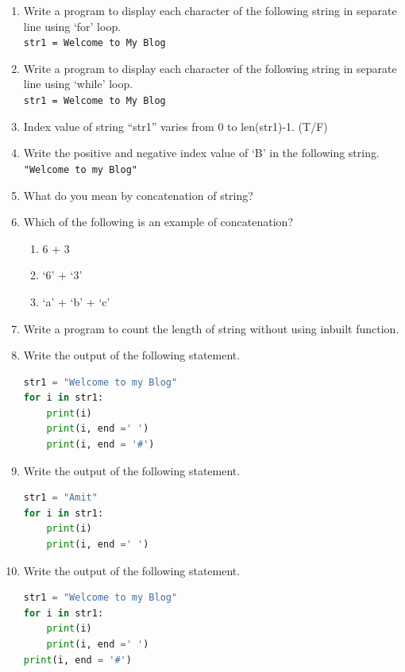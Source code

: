 \documentclass[12pt,a4paper]{article}
\begin{document}
\begin{enumerate}[label=\textbf{Q\arabic*.}]

\item Write a program to display each character of the following string in separate line using `for' loop. \\
\texttt{str1 = Welcome to My Blog}

\item Write a program to display each character of the following string in separate line using `while' loop. \\
\texttt{str1 = Welcome to My Blog}

\item Index value of string ``str1'' varies from 0 to len(str1)-1. (T/F)

\item Write the positive and negative index value of `B' in the following string. \\
\texttt{"Welcome to my Blog"}

\item What do you mean by concatenation of string?

\item Which of the following is an example of concatenation?       
\begin{enumerate}[label=\alph*.]
\item 6 + 3
\item `6' + `3'
\item `a' + `b' + `c'
\end{enumerate}

\item Write a program to count the length of string without using inbuilt function.

\item Write the output of the following statement.
\begin{lstlisting}[language=Python]
str1 = "Welcome to my Blog"
for i in str1:
    print(i)
    print(i, end =' ')
    print(i, end = '#')
\end{lstlisting}

\item Write the output of the following statement.
\begin{lstlisting}[language=Python]
str1 = "Amit"
for i in str1:
    print(i)
    print(i, end =' ')
\end{lstlisting}

\item Write the output of the following statement.
\begin{lstlisting}[language=Python]
str1 = "Welcome to my Blog"
for i in str1:
    print(i)
    print(i, end =' ')
print(i, end = '#')
\end{lstlisting}

\end{enumerate}
\end{document}
